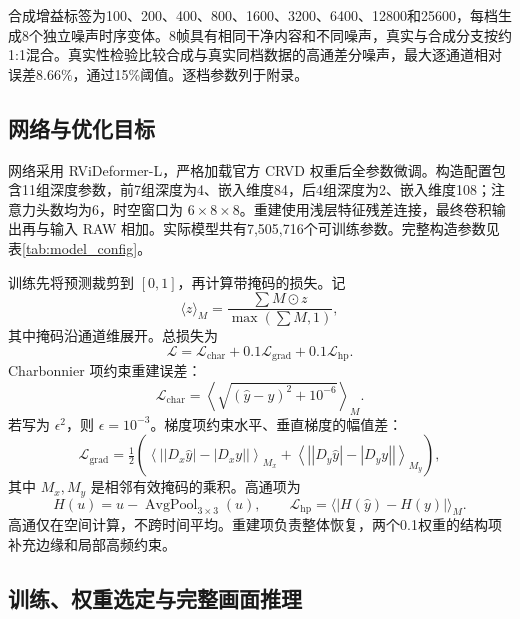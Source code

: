\documentclass[11pt,a4paper,UTF8,fontset=fandol]{ctexart}
\begin{document}
合成增益标签为100、200、400、800、1600、3200、6400、12800和25600，每档生成8个独立噪声时序变体。8帧具有相同干净内容和不同噪声，真实与合成分支按约1:1混合。真实性检验比较合成与真实同档数据的高通差分噪声，最大逐通道相对误差8.66\%，通过15\%阈值。逐档参数列于附录。

\subsection{网络与优化目标}

网络采用 RViDeformer-L，严格加载官方 CRVD 权重后全参数微调。构造配置包含11组深度参数，前7组深度为4、嵌入维度84，后4组深度为2、嵌入维度108；注意力头数均为6，时空窗口为 $6\times8\times8$。重建使用浅层特征残差连接，最终卷积输出再与输入 RAW 相加。实际模型共有7,505,716个可训练参数。完整构造参数见表\ref{tab:model_config}。

训练先将预测裁剪到 $[0,1]$，再计算带掩码的损失。记
\begin{equation}
 \langle z\rangle_M=\frac{\sum M\odot z}{\max(\sum M,1)},
\end{equation}
其中掩码沿通道维展开。总损失为
\begin{equation}
 \mathcal L=\mathcal L_{\mathrm{char}}+0.1\mathcal L_{\mathrm{grad}}+0.1\mathcal L_{\mathrm{hp}}.
 \label{eq:loss}
\end{equation}
Charbonnier 项\cite{r13}约束重建误差：
\begin{equation}
 \mathcal L_{\mathrm{char}}=\left\langle\sqrt{(\hat y-y)^2+10^{-6}}\right\rangle_M.
\end{equation}
若写为 $\epsilon^2$，则 $\epsilon=10^{-3}$。梯度项约束水平、垂直梯度的幅值差：
\begin{equation}
 \mathcal L_{\mathrm{grad}}=\tfrac12\left(
 \left\langle\left||D_x\hat y|-|D_xy|\right|\right\rangle_{M_x}+
 \left\langle\left||D_y\hat y|-|D_yy|\right|\right\rangle_{M_y}\right),
\end{equation}
其中 $M_x,M_y$ 是相邻有效掩码的乘积。高通项为
\begin{equation}
 H(u)=u-\operatorname{AvgPool}_{3\times3}(u),\qquad
 \mathcal L_{\mathrm{hp}}=\langle|H(\hat y)-H(y)|\rangle_M.
\end{equation}
高通仅在空间计算，不跨时间平均。重建项负责整体恢复，两个0.1权重的结构项补充边缘和局部高频约束。

\subsection{训练、权重选定与完整画面推理}
\end{document}
